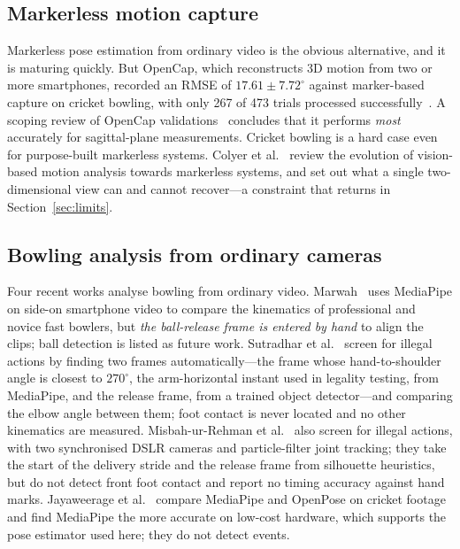 \documentclass[11pt,a4paper]{article}
\begin{document}
\subsection{Markerless motion capture}

Markerless pose estimation from ordinary video is the obvious alternative, and
it is maturing quickly. But OpenCap, which reconstructs 3D motion from two or
more smartphones, recorded an RMSE of $17.61 \pm 7.72^\circ$ against marker-based
capture on cricket bowling, with only 267 of 473 trials processed
successfully~\cite{abraham2025}. A scoping review of OpenCap
validations~\cite{opencap2026} concludes that it performs \emph{most}
accurately for sagittal-plane measurements. Cricket bowling is a hard case even
for purpose-built markerless systems. Colyer et
al.~\cite{colyer2018} review the evolution of vision-based motion analysis
towards markerless systems, and set out what a single two-dimensional view can
and cannot recover---a constraint that returns in Section~\ref{sec:limits}.

\subsection{Bowling analysis from ordinary cameras}

Four recent works analyse bowling from ordinary video. Marwah~\cite{marwah2025}
uses MediaPipe on side-on smartphone video to compare the kinematics of
professional and novice fast bowlers, but \emph{the ball-release frame is
entered by hand} to align the clips; ball detection is listed as future work.
Sutradhar et al.~\cite{illegal2026} screen for illegal actions by finding two
frames automatically---the frame whose hand-to-shoulder angle is closest to
$270^\circ$, the arm-horizontal instant used in legality testing, from
MediaPipe, and the release frame, from a trained object detector---and
comparing the elbow angle between them; foot contact is never located and no
other kinematics are measured. Misbah-ur-Rehman et al.~\cite{misbah2025} also
screen for illegal actions, with two synchronised DSLR cameras and
particle-filter joint tracking; they take the start of the delivery stride and
the release frame from silhouette heuristics, but do not detect front foot
contact and report no timing accuracy against hand marks. Jayaweerage et
al.~\cite{jayaweerage2024} compare MediaPipe and OpenPose on cricket footage
and find MediaPipe the more accurate on low-cost hardware, which supports the
pose estimator used here; they do not detect events.
\end{document}
